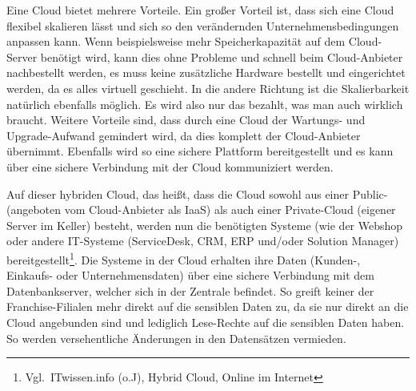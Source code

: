 Eine Cloud bietet mehrere Vorteile. Ein großer Vorteil ist, dass sich
eine Cloud flexibel skalieren lässt und sich so den verändernden
Unternehmensbedingungen anpassen kann. Wenn beispielsweise mehr
Speicherkapazität auf dem Cloud-Server benötigt wird, kann dies ohne
Probleme und schnell beim Cloud-Anbieter nachbestellt werden, es muss
keine zusätzliche Hardware bestellt und eingerichtet werden, da es
alles virtuell geschieht. In die andere Richtung ist die
Skalierbarkeit natürlich ebenfalls möglich. Es wird also nur das
bezahlt, was man auch wirklich braucht. Weitere Vorteile sind, dass
durch eine Cloud der Wartungs- und Upgrade-Aufwand gemindert wird, da
dies komplett der Cloud-Anbieter übernimmt. Ebenfalls wird so eine
sichere Plattform bereitgestellt und es kann über eine sichere
Verbindung mit der Cloud kommuniziert werden.

Auf dieser hybriden Cloud, das heißt, dass die Cloud sowohl aus einer
Public- (angeboten vom Cloud-Anbieter als IaaS) als auch einer
Private-Cloud (eigener Server im Keller) besteht, werden nun die
benötigten Systeme (wie der Webshop oder andere IT-Systeme
(ServiceDesk, CRM, ERP und/oder Solution Manager)
bereitgestellt\footnote{Vgl.~ITwissen.info (o.J), Hybrid Cloud,
  Online im Internet}. Die Systeme in der Cloud erhalten ihre Daten
(Kunden-, Einkaufs- oder Unternehmensdaten) über eine sichere
Verbindung mit dem Datenbankserver, welcher sich in der Zentrale
befindet. So greift keiner der Franchise-Filialen mehr direkt auf die
sensiblen Daten zu, da sie nur direkt an die Cloud angebunden sind und
lediglich Lese-Rechte auf die sensiblen Daten haben. So werden
versehentliche Änderungen in den Datensätzen vermieden.

